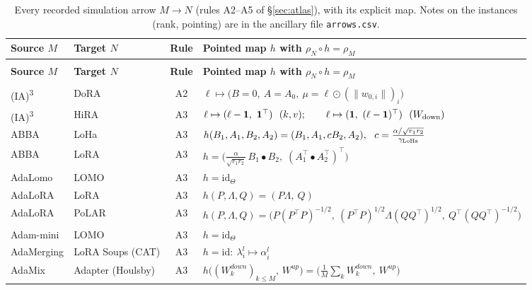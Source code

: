\begingroup\scriptsize\setlength{\tabcolsep}{3pt}\renewcommand{\arraystretch}{1.12}
\begin{longtable}{@{}>{\raggedright\arraybackslash}p{2.4cm}>{\raggedright\arraybackslash}p{2.4cm}c>{\raggedright\arraybackslash}p{8.6cm}@{}}
\caption{Every recorded simulation arrow $M\to N$ (rules A2--A5 of \S\ref{sec:atlas}), with its explicit map. Notes on the instances (rank, pointing) are in the ancillary file \texttt{arrows.csv}.}\label{tab:arrows}\\
\toprule\headrow\textbf{Source $M$} & \textbf{Target $N$} & \textbf{Rule} & \textbf{Pointed map $h$ with $\rho_N\circ h=\rho_M$}\\\midrule
\endfirsthead
\multicolumn{4}{@{}l}{\footnotesize\itshape Table~\ref{tab:arrows}, continued}\\
\toprule\headrow\textbf{Source $M$} & \textbf{Target $N$} & \textbf{Rule} & \textbf{Pointed map $h$ with $\rho_N\circ h=\rho_M$}\\\midrule
\endhead
\midrule
\multicolumn{4}{@{}r}{\footnotesize\itshape continued on the next page}\\
\endfoot
\bottomrule\endlastfoot
(IA)\textsuperscript{3} & DoRA & A2 & $\ell\mapsto\big(B=0,\ A=A_0,\ \mu=\ell\odot(\|w_{0,i}\|)_i\big)$\\
(IA)\textsuperscript{3} & HiRA & A3 & $\ell\mapsto(\ell-\mathbf 1,\ \mathbf 1^\top)\ \ (k,v);\qquad \ell\mapsto(\mathbf 1,\ (\ell-\mathbf 1)^\top)\ \ (W_{\rm down})$\\
ABBA & LoHa & A3 & $h(B_1,A_1,B_2,A_2)=(B_1,A_1,cB_2,A_2),\ \ c=\frac{\alpha/\sqrt{r_1r_2}}{\gamma_{\rm LoHa}}$\\
ABBA & LoRA & A3 & $h=\big(\tfrac{\alpha}{\sqrt{r_1r_2}}\,B_1\bullet B_2,\;(A_1^\top\bullet A_2^\top)^\top\big)$\\
AdaLomo & LOMO & A3 & $h=\mathrm{id}_\Theta$\\
AdaLoRA & LoRA & A3 & $h(P,\Lambda,Q)=(P\Lambda,\ Q)$\\
AdaLoRA & PoLAR & A3 & $h(P,\Lambda,Q)=\big(P(P^\top P)^{-1/2},\ (P^\top P)^{1/2}\Lambda(QQ^\top)^{1/2},\ Q^\top(QQ^\top)^{-1/2}\big)$\\
Adam-mini & LOMO & A3 & $h=\mathrm{id}_\Theta$\\
AdaMerging & LoRA Soups (CAT) & A3 & $h=\mathrm{id}:\ \lambda_i^{l}\mapsto\alpha_i^{l}$\\
AdaMix & Adapter (Houlsby) & A3 & $h\big((W^{down}_k)_{k\le M},\,W^{up}\big)=\big(\tfrac1M\textstyle\sum_kW^{down}_k,\ W^{up}\big)$\\

\end{longtable}
